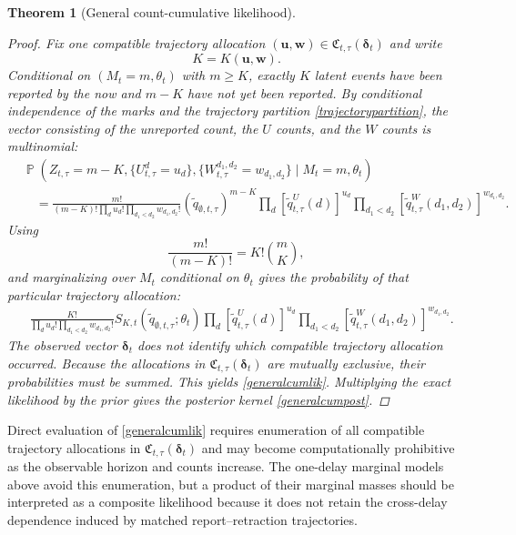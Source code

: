 \documentclass{article}
\newtheorem{theorem}{Theorem}
\theoremstyle{definition}
\theoremstyle{remark}
\newcommand{\Prb}{\operatorname{\mathbb{P}}}
\begin{document}
\begin{theorem}[General count-cumulative likelihood]
\begin{proof}
Fix one compatible trajectory allocation $(\boldsymbol u,\boldsymbol w)\in\mathfrak C_{t,\tau}(\boldsymbol\delta_t)$ and write
\begin{equation}
    K=K(\boldsymbol u,\boldsymbol w).
\end{equation}
Conditional on $(M_t=m,\theta_t)$ with $m\geq K$, exactly $K$ latent events have been reported by the now and $m-K$ have not yet been reported. By conditional independence of the marks and the trajectory partition \eqref{trajectorypartition}, the vector consisting of the unreported count, the $U$ counts, and the $W$ counts is multinomial:
\begin{equation}
\begin{split}
    &\Prb\left(
    Z_{t,\tau}=m-K,
    \{U_{t,\tau}^{d}=u_d\},
    \{W_{t,\tau}^{d_1,d_2}=w_{d_1,d_2}\}
    \mid M_t=m,\theta_t
    \right)\\
    &\quad=
    \frac{m!}
    {(m-K)!
    \displaystyle\prod_d u_d!
    \displaystyle\prod_{d_1<d_2}w_{d_1,d_2}!}
    \left(\tilde q_{\emptyset,t,\tau}\right)^{m-K}
    \prod_d
    \left[\tilde q_{t,\tau}^{U}(d)\right]^{u_d}
    \prod_{d_1<d_2}
    \left[\tilde q_{t,\tau}^{W}(d_1,d_2)\right]^{w_{d_1,d_2}}.
\end{split}
\end{equation}
Using
\begin{equation}
    \frac{m!}{(m-K)!}
    =
    K!\binom{m}{K},
\end{equation}
and marginalizing over $M_t$ conditional on $\theta_t$ gives the probability of that particular trajectory allocation:
\begin{equation}
\begin{split}
    &\frac{K!}
    {\displaystyle\prod_d u_d!
    \displaystyle\prod_{d_1<d_2}w_{d_1,d_2}!}
    S_{K,t}\left(\tilde q_{\emptyset,t,\tau};\theta_t\right)
    \prod_d
    \left[\tilde q_{t,\tau}^{U}(d)\right]^{u_d}
    \prod_{d_1<d_2}
    \left[\tilde q_{t,\tau}^{W}(d_1,d_2)\right]^{w_{d_1,d_2}}.
\end{split}
\end{equation}
The observed vector $\boldsymbol\delta_t$ does not identify which compatible trajectory allocation occurred. Because the allocations in $\mathfrak C_{t,\tau}(\boldsymbol\delta_t)$ are mutually exclusive, their probabilities must be summed. This yields \eqref{generalcumlik}. Multiplying the exact likelihood by the prior gives the posterior kernel \eqref{generalcumpost}.
\end{proof}
\end{theorem}

Direct evaluation of \eqref{generalcumlik} requires enumeration of all compatible trajectory allocations in $\mathfrak C_{t,\tau}(\boldsymbol\delta_t)$ and may become computationally prohibitive as the observable horizon and counts increase. The one-delay marginal models above avoid this enumeration, but a product of their marginal masses should be interpreted as a composite likelihood because it does not retain the cross-delay dependence induced by matched report--retraction trajectories.
\end{document}
